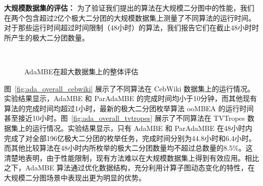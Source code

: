 


\textbf{大规模数据集的评估：} 为了验证我们提出的算法在大规模二分图中的性能，我们在两个包含超过2亿个极大二分团的大规模数据集上测量了不同算法的运行时间。对于那些运行时间超过时间限制（48小时）的算法，我们报告它们在截止48小时时所产生的极大二分团数量。

\begin{figure} [t]
  \centering
	\\

  \caption{AdaMBE在超大数据集上的整体评估}
  \label{fig:ada_overall_large}
\end{figure}


图~\ref{fig:ada_overall_cebwiki} 展示了不同算法在 CebWiki 数据集上的运行情况。实验结果显示，AdaMBE 和 ParAdaMBE 的完成时间均小于10分钟，而其他现有算法的完成时间均超过1小时，最新的极大二分团枚举算法 ooMBEA 的运行时间甚至接近10小时。图~\ref{fig:ada_overall_tvtropes} 展示了不同算法在 TVTropes 数据集上的运行情况。实验结果显示，只有 AdaMBE 和 ParAdaMBE 在48小时内完成了对全部196亿极大二分团的枚举任务，完成时间分别为44.8小时和6.4小时。而其他比较算法在48小时内所枚举的极大二分团数量均不超过总数量的8.5\%。这清楚地表明，由于性能限制，现有方法难以在大规模数据集上得到有效应用。相比之下，AdaMBE 算法通过优化数据结构，充分利用计算子图动态变化的特性，在大规模二分图场景中表现出更为明显的优势。

